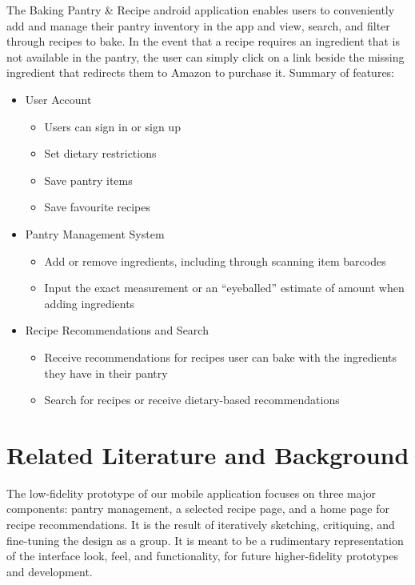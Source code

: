 \documentclass[manuscript, screen, nonacm]{acmart}
\begin{document}
    The Baking Pantry \& Recipe android application enables users to conveniently add and manage their pantry inventory in the app and view, search, and filter through recipes to bake. In the event that a recipe requires an ingredient that is not available in the pantry, the user can simply click on a link beside the missing ingredient that redirects them to Amazon to purchase it. Summary of features:
\begin{itemize}
    \item User Account
    \begin{itemize}
        \item Users can sign in or sign up
        \item Set dietary restrictions
        \item Save pantry items
        \item Save favourite recipes
    \end{itemize} 
    \item Pantry Management System
        \begin{itemize}
        \item Add or remove ingredients, including through scanning item barcodes
        \item Input the exact measurement or an “eyeballed” estimate of amount when adding ingredients
    \end{itemize} 
    \item Recipe Recommendations and Search
        \begin{itemize}
        \item Receive recommendations for recipes user can bake with the ingredients they have in their pantry
        \item Search for recipes or receive dietary-based recommendations
    \end{itemize} 
\end{itemize}


\section{Related Literature and Background}


    The low-fidelity prototype of our mobile application focuses on three major components: pantry management, a selected recipe page, and a home page for recipe recommendations. It is the result of iteratively  sketching, critiquing, and fine-tuning the design as a group. It is meant to be a rudimentary representation of the interface look, feel, and functionality, for future higher-fidelity prototypes and development.
\end{document}
